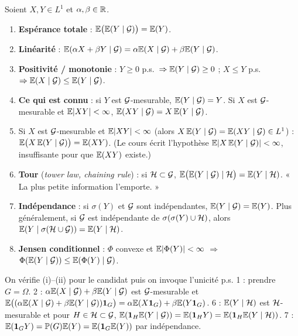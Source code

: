 \documentclass[11pt,a4paper]{article}
\begin{document}
\begin{proposition}\label{C6:prop}
Soient $X,Y\in L^1$ et $\alpha,\beta\in\mathbb{R}$.
\begin{enumerate}
  \item \textbf{Espérance totale} : $\mathbb{E}\bigl(\mathbb{E}(Y\mid\mathcal{G})\bigr)=\mathbb{E}(Y)$.
  \item \textbf{Linéarité} : $\mathbb{E}(\alpha X+\beta Y\mid\mathcal{G})=\alpha\mathbb{E}(X\mid\mathcal{G})+\beta\mathbb{E}(Y\mid\mathcal{G})$.
  \item \textbf{Positivité / monotonie} : $Y\ge0$ p.s.\ $\Rightarrow\mathbb{E}(Y\mid\mathcal{G})\ge0$ ; $X\le Y$ p.s.\ $\Rightarrow\mathbb{E}(X\mid\mathcal{G})\le\mathbb{E}(Y\mid\mathcal{G})$.
  \item \textbf{Ce qui est connu} : si $Y$ est $\mathcal{G}$-mesurable, $\mathbb{E}(Y\mid\mathcal{G})=Y$. Si $X$ est $\mathcal{G}$-mesurable et $\mathbb{E}|XY|<\infty$,
  $\mathbb{E}(XY\mid\mathcal{G})=X\,\mathbb{E}(Y\mid\mathcal{G})$.
  \item Si $X$ est $\mathcal{G}$-mesurable et $\mathbb{E}|XY|<\infty$ (alors $X\,\mathbb{E}(Y\mid\mathcal{G})=\mathbb{E}(XY\mid\mathcal{G})\in L^1$) : $\mathbb{E}\bigl(X\,\mathbb{E}(Y\mid\mathcal{G})\bigr)=\mathbb{E}(XY)$.
  (Le cours écrit l'hypothèse $\mathbb{E}|X\,\mathbb{E}(Y\mid\mathcal{G})|<\infty$, insuffisante pour que $\mathbb{E}(XY)$ existe.)
  \item \textbf{Tour} (\emph{tower law, chaining rule}) : si $\mathcal{H}\subset\mathcal{G}$, $\mathbb{E}\bigl(\mathbb{E}(Y\mid\mathcal{G})\mid\mathcal{H}\bigr)=\mathbb{E}(Y\mid\mathcal{H})$.
  « La plus petite information l'emporte. »
  \item \textbf{Indépendance} : si $\sigma(Y)$ et $\mathcal{G}$ sont indépendantes, $\mathbb{E}(Y\mid\mathcal{G})=\mathbb{E}(Y)$. Plus généralement, si $\mathcal{G}$ est
  indépendante de $\sigma(\sigma(Y)\cup\mathcal{H})$, alors $\mathbb{E}(Y\mid\sigma(\mathcal{H}\cup\mathcal{G}))=\mathbb{E}(Y\mid\mathcal{H})$.
  \item \textbf{Jensen conditionnel} : $\Phi$ convexe et $\mathbb{E}|\Phi(Y)|<\infty$ $\Rightarrow$ $\Phi(\mathbb{E}(Y\mid\mathcal{G}))\le\mathbb{E}(\Phi(Y)\mid\mathcal{G})$.
\end{enumerate}
\end{proposition}
\begin{idee}
On vérifie (i)--(ii) pour le candidat puis on invoque l'unicité p.s.
1 : prendre $G=\Omega$. 2 : $\alpha\mathbb{E}(X\mid\mathcal{G})+\beta\mathbb{E}(Y\mid\mathcal{G})$ est $\mathcal{G}$-mesurable et
$\mathbb{E}\bigl((\alpha\mathbb{E}(X\mid\mathcal{G})+\beta\mathbb{E}(Y\mid\mathcal{G}))\mathbf{1}_G\bigr)=\alpha\mathbb{E}(X\mathbf{1}_G)+\beta\mathbb{E}(Y\mathbf{1}_G)$.
6 : $\mathbb{E}(Y\mid\mathcal{H})$ est $\mathcal{H}$-mesurable et pour $H\in\mathcal{H}\subset\mathcal{G}$, $\mathbb{E}(\mathbf{1}_H\mathbb{E}(Y\mid\mathcal{G}))=\mathbb{E}(\mathbf{1}_HY)=\mathbb{E}(\mathbf{1}_H\mathbb{E}(Y\mid\mathcal{H}))$.
7 : $\mathbb{E}(\mathbf{1}_GY)=\mathbb{P}(G)\mathbb{E}(Y)=\mathbb{E}(\mathbf{1}_G\mathbb{E}(Y))$ par indépendance.
\end{idee}
\end{document}
